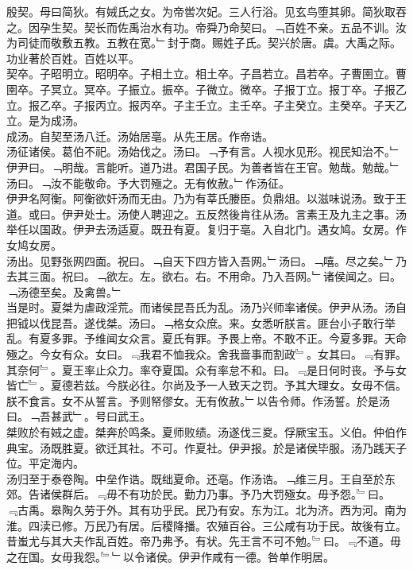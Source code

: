 \documentclass{zhvt-classic}
\begin{document}
\hspace*{2em}殷契。母曰简狄。有娀氏之女。为帝喾次妃。三人行浴。见玄鸟堕其卵。简狄取吞之。因孕生契。契长而佐禹治水有功。帝舜乃命契曰。﹁百姓不亲。五品不训。汝为司徒而敬敷五教。五教在宽。﹂封于商。赐姓子氏。契兴於唐。虞。大禹之际。功业著於百姓。百姓以平。\\
\hspace*{2em}契卒。子昭明立。昭明卒。子相土立。相土卒。子昌若立。昌若卒。子曹圉立。曹圉卒。子冥立。冥卒。子振立。振卒。子微立。微卒。子报丁立。报丁卒。子报乙立。报乙卒。子报丙立。报丙卒。子主壬立。主壬卒。子主癸立。主癸卒。子天乙立。是为成汤。\\
\hspace*{2em}成汤。自契至汤八迁。汤始居亳。从先王居。作帝诰。\\
\hspace*{2em}汤征诸侯。葛伯不祀。汤始伐之。汤曰。﹁予有言。人视水见形。视民知治不。﹂伊尹曰。﹁明哉。言能听。道乃进。君国子民。为善者皆在王官。勉哉。勉哉。﹂汤曰。﹁汝不能敬命。予大罚殛之。无有攸赦。﹂作汤征。\\
\hspace*{2em}伊尹名阿衡。阿衡欲奸汤而无由。乃为有莘氏媵臣。负鼎俎。以滋味说汤。致于王道。或曰。伊尹处士。汤使人聘迎之。五反然後肯往从汤。言素王及九主之事。汤举任以国政。伊尹去汤适夏。既丑有夏。复归于亳。入自北门。遇女鸠。女房。作女鸠女房。\\
\hspace*{2em}汤出。见野张网四面。祝曰。﹁自天下四方皆入吾网。﹂汤曰。﹁嘻。尽之矣。﹂乃去其三面。祝曰。﹁欲左。左。欲右。右。不用命。乃入吾网。﹂诸侯闻之。曰。﹁汤德至矣。及禽兽。﹂\\
\hspace*{2em}当是时。夏桀为虐政淫荒。而诸侯昆吾氏为乱。汤乃兴师率诸侯。伊尹从汤。汤自把钺以伐昆吾。遂伐桀。汤曰。﹁格女众庶。来。女悉听朕言。匪台小子敢行举乱。有夏多罪。予维闻女众言。夏氏有罪。予畏上帝。不敢不正。今夏多罪。天命殛之。今女有众。女曰。﹃我君不恤我众。舍我啬事而割政﹄。女其曰。﹃有罪。其奈何﹄。夏王率止众力。率夺夏国。众有率怠不和。曰。﹃是日何时丧。予与女皆亡﹄。夏德若兹。今朕必往。尔尚及予一人致天之罚。予其大理女。女毋不信。朕不食言。女不从誓言。予则帑僇女。无有攸赦。﹂以告令师。作汤誓。於是汤曰。﹁吾甚武﹂。号曰武王。\\
\hspace*{2em}桀败於有娀之虚。桀奔於鸣条。夏师败绩。汤遂伐三㚇。俘厥宝玉。义伯。仲伯作典宝。汤既胜夏。欲迁其社。不可。作夏社。伊尹报。於是诸侯毕服。汤乃践天子位。平定海内。\\
\hspace*{2em}汤归至于泰卷陶。中垒作诰。既绌夏命。还亳。作汤诰。﹁维三月。王自至於东郊。告诸侯群后。﹃毋不有功於民。勤力乃事。予乃大罚殛女。毋予怨。﹄曰。﹃古禹。皋陶久劳于外。其有功乎民。民乃有安。东为江。北为济。西为河。南为淮。四渎已修。万民乃有居。后稷降播。农殖百谷。三公咸有功于民。故後有立。昔蚩尤与其大夫作乱百姓。帝乃弗予。有状。先王言不可不勉。﹄曰。﹃不道。毋之在国。女毋我怨。﹄﹂以令诸侯。伊尹作咸有一德。咎单作明居。\\
\end{document}
